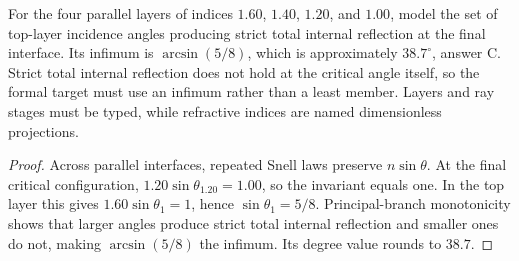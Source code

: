 \begin{theorem}
\label{thm:physics:phyx_mini_0021:target}
For the four parallel layers of indices $1.60$, $1.40$, $1.20$, and $1.00$,
model the set of top-layer incidence angles producing strict total internal
reflection at the final interface. Its infimum is $\arcsin(5/8)$, which is
approximately $38.7^\circ$, answer C. Strict total internal reflection does
not hold at the critical angle itself, so the formal target must use an
infimum rather than a least member. Layers and ray stages must be typed,
while refractive indices are named dimensionless projections.
\end{theorem}
\begin{proof}
Across parallel interfaces, repeated Snell laws preserve $n\sin\theta$.
At the final critical configuration,
$1.20\sin\theta_{1.20}=1.00$, so the invariant equals one. In the top layer
this gives $1.60\sin\theta_1=1$, hence
$\sin\theta_1=5/8$. Principal-branch monotonicity shows that larger angles
produce strict total internal reflection and smaller ones do not, making
$\arcsin(5/8)$ the infimum. Its degree value rounds to $38.7$.
\end{proof}

